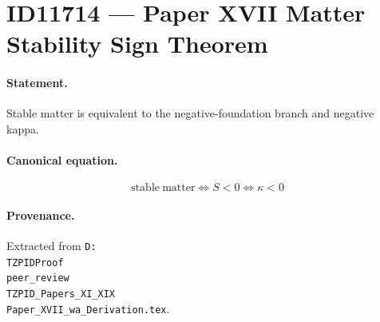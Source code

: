\section*{ID11714 --- Paper XVII Matter Stability Sign Theorem}

\paragraph{Statement.}
Stable matter is equivalent to the negative-foundation branch and negative kappa.

\paragraph{Canonical equation.}
\[
\mathrm{stable\ matter}\iff S<0\iff\kappa<0
\]

\paragraph{Provenance.}
Extracted from \texttt{D:\\TZPIDProof\\peer\_review\\TZPID\_Papers\_XI\_XIX\\Paper\_XVII\_wa\_Derivation.tex}.
